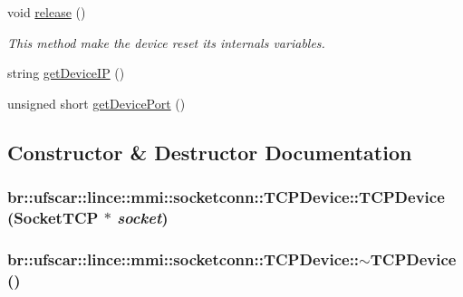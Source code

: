 \begin{DoxyCompactItemize}
void \hyperlink{classbr_1_1ufscar_1_1lince_1_1mmi_1_1socketconn_1_1TCPDevice_a4004f2bdb8466c2613654469d0863f78}{release} ()
\begin{DoxyCompactList}\small\item\em This method make the device reset its internals variables. \item\end{DoxyCompactList}\item 
string \hyperlink{classbr_1_1ufscar_1_1lince_1_1mmi_1_1socketconn_1_1TCPDevice_a3d899beea9a5d297ee21931be41684ec}{getDeviceIP} ()
\item 
unsigned short \hyperlink{classbr_1_1ufscar_1_1lince_1_1mmi_1_1socketconn_1_1TCPDevice_a163fd810dccd2682328735a02699372d}{getDevicePort} ()
\end{DoxyCompactItemize}


\subsection{Constructor \& Destructor Documentation}
\hypertarget{classbr_1_1ufscar_1_1lince_1_1mmi_1_1socketconn_1_1TCPDevice_abad8a6e03c83f08d453c45802dbf5d24}{
\subsubsection[{TCPDevice}]{\setlength{\rightskip}{0pt plus 5cm}br::ufscar::lince::mmi::socketconn::TCPDevice::TCPDevice ({\bf SocketTCP} $\ast$ {\em socket})}}
\label{classbr_1_1ufscar_1_1lince_1_1mmi_1_1socketconn_1_1TCPDevice_abad8a6e03c83f08d453c45802dbf5d24}
\hypertarget{classbr_1_1ufscar_1_1lince_1_1mmi_1_1socketconn_1_1TCPDevice_a54143d24714fe38957c7f3432d7f4ddf}{
\subsubsection[{$\sim$TCPDevice}]{\setlength{\rightskip}{0pt plus 5cm}br::ufscar::lince::mmi::socketconn::TCPDevice::$\sim$TCPDevice ()}}
\label{classbr_1_1ufscar_1_1lince_1_1mmi_1_1socketconn_1_1TCPDevice_a54143d24714fe38957c7f3432d7f4ddf}


